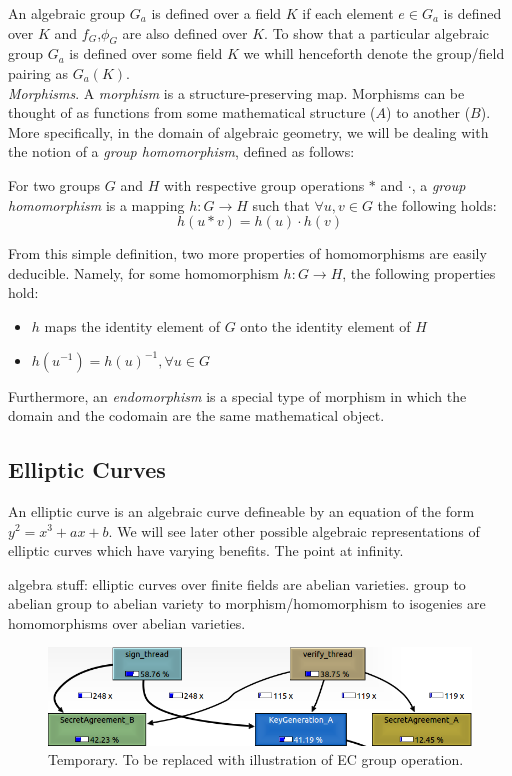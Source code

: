 An algebraic group $G_a$ is defined over a field $K$ if each element $e \in G_a$ is defined over $K$ and $f_G$,$\phi_G$ are also defined over $K$. To show that a particular algebraic group $G_a$ is defined over some field $K$ we whill henceforth denote the group/field pairing as $G_a(K)$.\\

\noindent
\emph{Morphisms}. A \emph{morphism} is a structure-preserving map. Morphisms can be thought of as functions from some mathematical structure ($A$) to another ($B$). More specifically, in the domain of algebraic geometry, we will be dealing with the notion of a \emph{group homomorphism}, defined as follows:
\begin{definition}
\label{defn:homomorphism}
For two groups $G$ and $H$ with respective group operations $*$ and $\cdot$, a \emph{group homomorphism} is a mapping $h: G \rightarrow H$ such that $\forall u, v \in G$ the following holds:
$$h(u * v) = h(u) \cdot h(v)$$
\end{definition}
From this simple definition, two more properties of homomorphisms are easily deducible. Namely, for some homomorphism $h: G \rightarrow H$, the following properties hold:
\begin{itemize}
\item $h$ maps the identity element of $G$ onto the identity element of $H$
\item $h(u^{-1}) = h(u)^{-1}, \forall u \in G$
\end{itemize}
Furthermore, an \emph{endomorphism} is a special type of morphism in which the domain and the codomain are the same mathematical object.

\subsection{Elliptic Curves}

An elliptic curve is an algebraic curve defineable by an equation of the form $y^2 = x^3 + ax + b$. We will see later other possible algebraic representations of  elliptic curves which have varying benefits.
The point at infinity.

algebra stuff:
elliptic curves over finite fields are abelian varieties. 
group to abelian group to abelian variety to morphism/homomorphism to isogenies are homomorphisms over abelian varieties.

\begin{figure}[htb]
\centering
\includegraphics[scale=0.3]{signandverifycall.png} %
\caption{Temporary. To be replaced with illustration of EC group operation.}
\label{fig:label} %
\end{figure}

